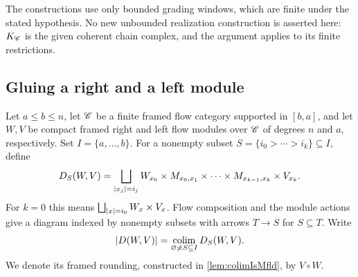 The constructions use only bounded grading windows, which are finite under the stated hypothesis. No new unbounded realization construction is asserted here: $K_{\mathscr{C}}$ is the given coherent chain complex, and the argument applies to its finite restrictions.

\subsection{Gluing a right and a left module}

\begin{defn}\label{def:CompCat}
    Let $a\leq b\leq n$, let $\mathscr{C}$ be a finite framed flow category supported in $[b,a]$, and let $W,V$ be compact framed right and left flow modules over $\mathscr{C}$ of degrees $n$ and $a$, respectively. Set $I=\{a,\ldots,b\}$. For a nonempty subset $S=\{i_0>\cdots>i_k\}\subseteq I$, define
    \[
        D_S(W,V)=
        \bigsqcup_{\left\lvert x_j\right\rvert=i_j}
        W_{x_0}\times M_{x_0,x_1}\times\cdots
        \times M_{x_{k-1},x_k}\times V_{x_k}.
    \]
    For $k=0$ this means $\bigsqcup_{\left\lvert x\right\rvert=i_0}W_x\times V_x$. Flow composition and the module actions give a diagram indexed by nonempty subsets with arrows $T\to S$ for $S\subseteq T$. Write
    \[
        |D(W,V)|=\operatorname*{colim}_{\varnothing\ne S\subseteq I}D_S(W,V).
    \]
    We denote its framed rounding, constructed in \cref{lem:colimIsMfld}, by $V\circ W$.
\end{defn}

